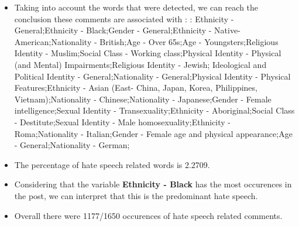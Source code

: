 \documentclass[11pt]{article}
\begin{document}
\begin{itemize}\item Taking into account the words that were detected, we can reach the conclusion these comments are associated with : : Ethnicity - General;Ethnicity - Black;Gender - General;Ethnicity - Native-American;Nationality - British;Age - Over 65s;Age - Youngsters;Religious Identity - Muslim;Social Class - Working class;Physical Identity - Physical (and Mental) Impairments;Religious Identity - Jewish; Ideological and Political Identity - General;Nationality - General;Physical Identity - Physical Features;Ethnicity - Asian (East- China, Japan, Korea, Philippines, Vietnam);Nationality - Chinese;Nationality - Japanese;Gender - Female intelligence;Sexual Identity - Transexuality;Ethnicity - Aboriginal;Social Class - Destitute;Sexual Identity - Male homosexuality;Ethnicity - Roma;Nationality - Italian;Gender - Female age and physical appearance;Age - General;Nationality - German;%

\item The percentage of hate speech related words is 2.2709.

\item Considering that the variable \textbf{Ethnicity - Black} has the most occurences in the post, we can interpret that this is the predominant hate speech.

\item Overall there were 1177/1650 occurences of hate speech related comments.\end{itemize}
\end{document}

